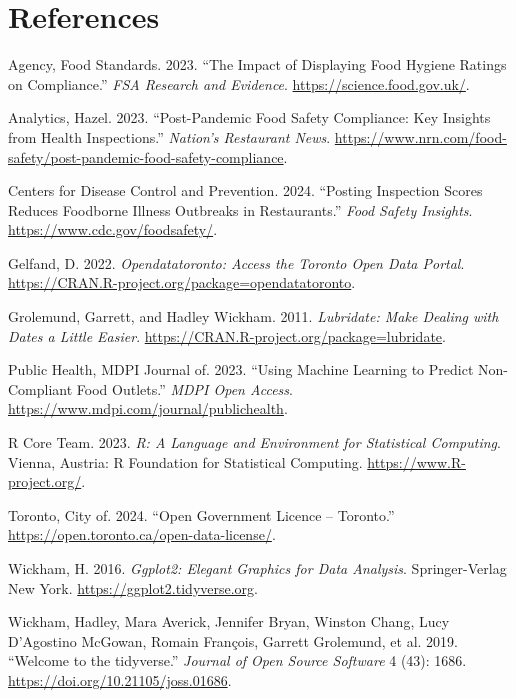 \documentclass[
  letterpaper,
  DIV=11,
  numbers=noendperiod]{scrartcl}
\newlength{\cslhangindent}
\newenvironment{CSLReferences}[2] %
 {\begin{list}{}{%
  \setlength{\itemindent}{0pt}
  \setlength{\leftmargin}{0pt}
  \setlength{\parsep}{0pt}
  \ifodd #1
   \setlength{\leftmargin}{\cslhangindent}
   \setlength{\itemindent}{-1\cslhangindent}
  \fi
  \setlength{\itemsep}{#2\baselineskip}}}
 {\end{list}}
\begin{document}
\newpage

\section*{References}\label{sec-references}

\label{refs}
\begin{CSLReferences}{1}{0}
Agency, Food Standards. 2023. {``The Impact of Displaying Food Hygiene
Ratings on Compliance.''} \emph{FSA Research and Evidence}.
\url{https://science.food.gov.uk/}.

Analytics, Hazel. 2023. {``Post-Pandemic Food Safety Compliance: Key
Insights from Health Inspections.''} \emph{Nation's Restaurant News}.
\url{https://www.nrn.com/food-safety/post-pandemic-food-safety-compliance}.

Centers for Disease Control and Prevention. 2024. {``Posting Inspection
Scores Reduces Foodborne Illness Outbreaks in Restaurants.''} \emph{Food
Safety Insights}. \url{https://www.cdc.gov/foodsafety/}.

Gelfand, D. 2022. \emph{Opendatatoronto: Access the Toronto Open Data
Portal}. \url{https://CRAN.R-project.org/package=opendatatoronto}.

Grolemund, Garrett, and Hadley Wickham. 2011. \emph{Lubridate: Make
Dealing with Dates a Little Easier}.
\url{https://CRAN.R-project.org/package=lubridate}.

Public Health, MDPI Journal of. 2023. {``Using Machine Learning to
Predict Non-Compliant Food Outlets.''} \emph{MDPI Open Access}.
\url{https://www.mdpi.com/journal/publichealth}.

R Core Team. 2023. \emph{R: A Language and Environment for Statistical
Computing}. Vienna, Austria: R Foundation for Statistical Computing.
\url{https://www.R-project.org/}.

Toronto, City of. 2024. {``Open Government Licence -- Toronto.''}
\url{https://open.toronto.ca/open-data-license/}.

Wickham, H. 2016. \emph{Ggplot2: Elegant Graphics for Data Analysis}.
Springer-Verlag New York. \url{https://ggplot2.tidyverse.org}.

Wickham, Hadley, Mara Averick, Jennifer Bryan, Winston Chang, Lucy
D'Agostino McGowan, Romain François, Garrett Grolemund, et al. 2019.
{``Welcome to the {tidyverse}.''} \emph{Journal of Open Source Software}
4 (43): 1686. \url{https://doi.org/10.21105/joss.01686}.

\end{CSLReferences}
\end{document}
